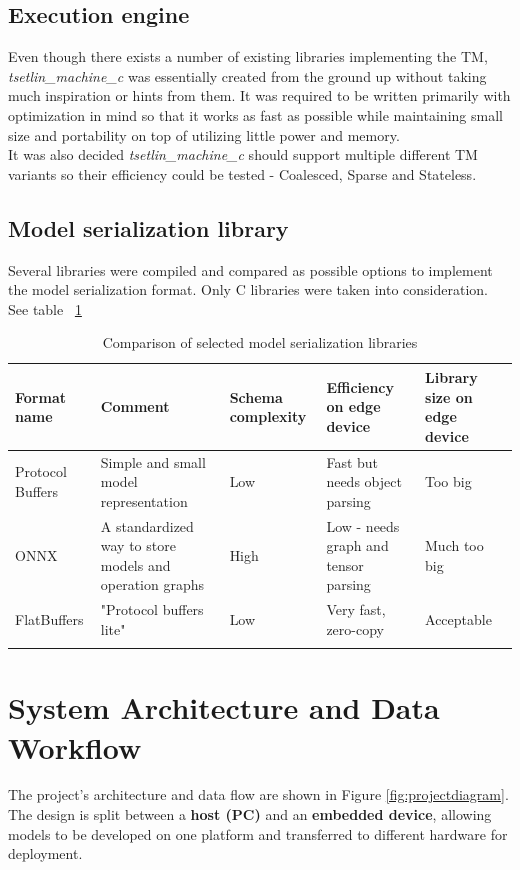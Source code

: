 \documentclass[english]{aghengthesis} %
\newcommand*{\LibraryName}{\emph{tsetlin\_machine\_c }}
\begin{document}
\subsection{Execution engine}
Even though there exists a number of existing libraries implementing the TM, \LibraryName was essentially created from the ground up without taking much inspiration or hints from them. It was required to be written primarily with optimization in mind so that it works as fast as possible while maintaining small size and portability on top of utilizing little power and memory. \\
It was also decided \LibraryName should support multiple different TM variants so their efficiency could be tested - Coalesced, Sparse and Stateless.

\newpage
\subsection{Model serialization library}
Several libraries were compiled and compared as possible options to implement the model serialization format. Only C libraries were taken into consideration. See table ~\ref{tab:serial-lib-comp}
\begin{table}[h]
\centering
\begin{tabularx}{\textwidth}{
  | >{\raggedright\arraybackslash}X 
  | >{\raggedright\arraybackslash}X 
  | >{\raggedright\arraybackslash}X 
  | >{\raggedright\arraybackslash}X 
  | >{\raggedright\arraybackslash}X |
}
\hline
Format name & Comment & Schema complexity & Efficiency on edge device & Library size on edge device \\
\hline
Protocol Buffers & Simple and small model representation & Low & Fast but needs object parsing & Too big \\
\hline
ONNX & A standardized way to store models and operation graphs & High & Low - needs graph and tensor parsing & Much too big \\
\hline
FlatBuffers & "Protocol buffers lite" & Low & Very fast, zero-copy & Acceptable \\
\hline
\caption{Comparison of selected model serialization libraries}
\label{tab:serial-lib-comp}
\end{tabularx}
\end{table}

\clearpage
\section{System Architecture and Data Workflow}
\label{sec:system-architecture}
The project's architecture and data flow are shown in Figure \ref{fig:projectdiagram}. The design is split between a \textbf{host (PC)} and an \textbf{embedded device}, allowing models to be developed on one platform and transferred to different hardware for deployment.
\end{document}
